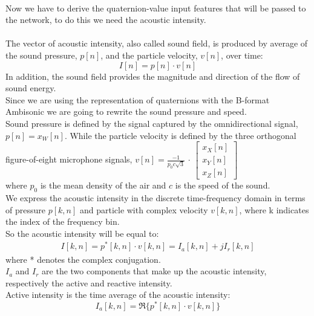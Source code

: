 \documentclass{article}
\begin{document}
    \\ Now we have to derive the quaternion-value input features that will be passed to the network, to do this we need the
    acoustic intensity.
    \\ \\ The vector of acoustic intensity, also called sound field, is produced by average of the sound pressure, $p[n]$, and
    the particle velocity, $v[n]$, over time:
    \begin{equation*}
        I[n]=p[n] \cdot v[n]
    \end{equation*}
    In addition, the sound field provides the magnitude and direction of the flow of sound energy.
    \\ Since we are using the representation of quaternions with the B-format Ambisonic we are going to rewrite the sound 
    pressure and speed.
    \\ Sound pressure is defined by the signal captured by the omnidirectional signal, $p[n] = x_W[n]$.
    While the particle velocity is defined by the three orthogonal figure-of-eight microphone signals, $v[n]= \frac{-1}{p_0c\sqrt{3}}$ $\cdot$
    $\begin{bmatrix}
            x_X[n] \\
            x_Y[n] \\
            x_Z[n]
        \end{bmatrix}
    $
    \\ where $p_0$ is the mean density of the air and $c$ is the speed of the sound.
    \\ We express the acoustic intensity in the discrete time-frequency domain in terms of pressure $p[k,n]$ and particle with complex
    velocity $v[k, n]$, where k indicates the index of the frequency bin.
    \\ So the acoustic intensity will be equal to:
    \begin{equation*}
        \begin{matrix}
            I[k,n] = p^*[k,n] \cdot v[k,n] = I_a[k,n]+jI_r[k,n]
        \end{matrix}
    \end{equation*}
    where * denotes the complex conjugation.
    \\ $I_a$ and $I_r$ are the two components that make up the acoustic intensity, respectively the active and reactive intensity.
    \\ Active intensity is the time average of the acoustic intensity:
    \begin{equation*}
        I_a [k,n]= \Re\{ p^*[k,n]\cdot v[k,n]\} 
    \end{equation*}
\end{document}
